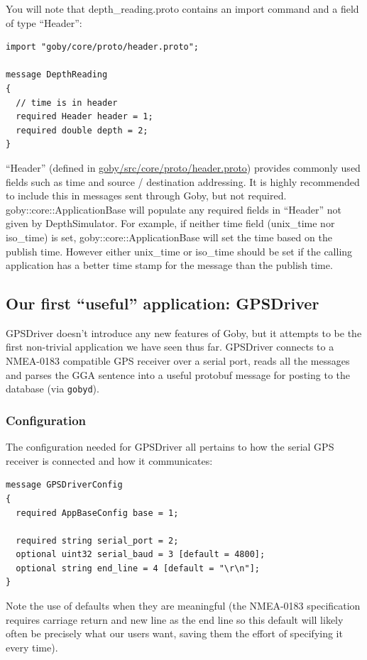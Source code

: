 \documentclass[11pt, letterpaper]{article}
\begin{document}
You will note that depth\_reading.proto contains an import command and a field of type ``Header'':
\begin{verbatim}
import "goby/core/proto/header.proto";

message DepthReading
{
  // time is in header
  required Header header = 1;
  required double depth = 2;
}
\end{verbatim}

``Header'' (defined in \href{http://bazaar.launchpad.net/~goby-dev/goby/trunk/annotate/head:/src/core/proto/header.proto}{goby/src/core/proto/header.proto}) provides commonly used fields such as time and source / destination addressing. It is highly recommended to include this in messages sent through Goby, but not required. goby::core::ApplicationBase will populate any required fields in ``Header'' not given by DepthSimulator. For example, if neither time field (unix\_time nor iso\_time) is set, goby::core::ApplicationBase will set the time based on the publish time. However either unix\_time or iso\_time should be set if the calling application has a better time stamp for the message than the publish time.

\subsection{Our first ``useful'' application: GPSDriver}

GPSDriver doesn't introduce any new features of Goby, but it attempts to be the first non-trivial application we have seen thus far. GPSDriver connects to a NMEA-0183 compatible GPS receiver over a serial port, reads all the messages and parses the GGA sentence into a useful protobuf message for posting to the database (via \texttt{gobyd}). 

\subsubsection{Configuration}
The configuration needed for GPSDriver all pertains to how the serial GPS receiver is connected and how it communicates:
\begin{verbatim}
message GPSDriverConfig
{
  required AppBaseConfig base = 1;

  required string serial_port = 2;
  optional uint32 serial_baud = 3 [default = 4800];
  optional string end_line = 4 [default = "\r\n"];
}
\end{verbatim}

Note the use of defaults when they are meaningful (the NMEA-0183 specification requires carriage return and new line as the end line so this default will likely often be precisely what our users want, saving them the effort of specifying it every time).
\end{document}

